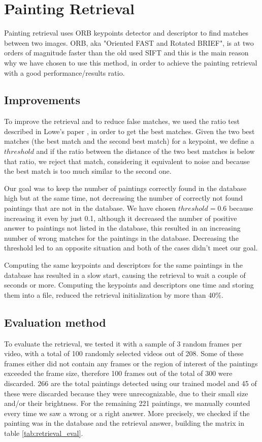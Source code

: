\section{Painting Retrieval}
Painting retrieval uses ORB \cite{orb} keypoints detector and descriptor to find matches between two images. ORB, aka "Oriented FAST and Rotated BRIEF", is at two orders of magnitude faster than the old used SIFT \cite{sift} and this is the main reason why we have chosen to use this method, in order to achieve the painting retrieval with a good performance/results ratio.
\subsection{Improvements}
To improve the retrieval and to reduce false matches, we used the ratio test described in Lowe's paper \cite{sift}, in order to get the best matches. Given the two best matches (the best match and the second best match) for a keypoint, we define a \(threshold\) and if the ratio between the distance of the two best matches is below that ratio, we reject that match, considering it equivalent to noise and because the best match is too much similar to the second one. 

Our goal was to keep the number of paintings correctly found in the database high but at the same time, not decreasing the number of correctly not found paintings that are not in the database. We have chosen \(threshold = 0.6\) because increasing it even by just 0.1, although it decreased the number of positive answer to paintings not listed in the database, this resulted in an increasing number of wrong matches for the paintings in the database. Decreasing the threshold led to an opposite situation and both of the cases didn't meet our goal.

Computing the same keypoints and descriptors for the same paintings in the database has resulted in a slow start, causing the retrieval to wait a couple of seconds or more. Computing the keypoints and descriptors one time and storing them into a file, reduced the retrieval initialization by more than 40\%.
\subsection{Evaluation method}
To evaluate the retrieval, we tested it with a sample of 3 random frames per video, with a total of 100 randomly selected videos out of 208. Some of these frames either did not contain any frames or the region of interest of the paintings exceeded the frame size, therefore 100 frames out of the total of 300 were discarded. 266 are the total paintings detected using our trained model and 45 of these were discarded because they were unrecognizable, due to their small size and/or their brightness. 
For the remaining 221 paintings, we manually counted every time we saw a wrong or a right answer. More precisely, we checked if the painting was in the database and the retrieval answer, building the matrix in table \ref{tab:retrieval_eval}.

